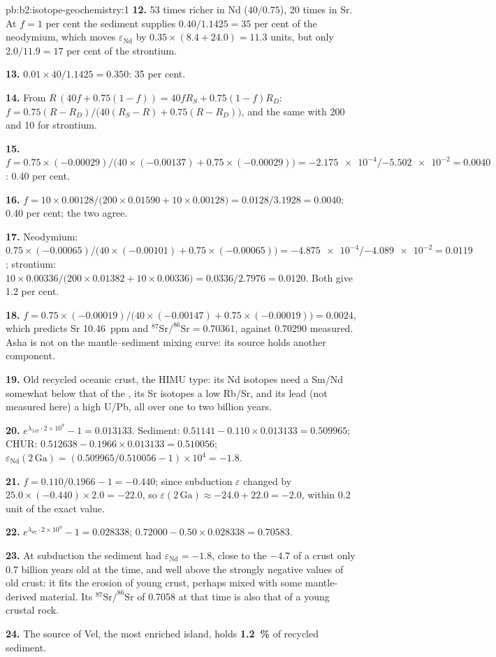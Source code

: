 \begin{solution}{pb:b2:isotope-geochemistry:1}
\textbf{12.} 53 times richer in Nd ($40/0.75$), 20 times in Sr. At $f = 1$ per cent the
sediment supplies $0.40/1.1425 = 35$ per cent of the neodymium, which moves
$\varepsilon_{\mathrm{Nd}}$ by $0.35\times(8.4 + 24.0) = 11.3$ units, but only $2.0/11.9 =
17$ per cent of the strontium.

\textbf{13.} $0.01\times40/1.1425 = 0.350$: 35 per cent.

\textbf{14.} From $R\,(40f + 0.75(1-f)) = 40fR_S + 0.75(1-f)R_D$:
$f = 0.75(R - R_D)/\bigl(40(R_S - R) + 0.75(R - R_D)\bigr)$, and the same with 200
and 10 for strontium.

\textbf{15.} $f = 0.75\times(-0.00029)/\bigl(40\times(-0.00137) + 0.75\times(-0.00029)\bigr)
= \num{-2.175e-4}/\num{-5.502e-2} = 0.0040$: 0.40 per cent.

\textbf{16.} $f = 10\times0.00128/\bigl(200\times0.01590 + 10\times0.00128\bigr) =
0.0128/3.1928 = 0.0040$: 0.40 per cent; the two agree.

\textbf{17.} Neodymium: $0.75\times(-0.00065)/\bigl(40\times(-0.00101) +
0.75\times(-0.00065)\bigr) = \num{-4.875e-4}/\num{-4.089e-2} = 0.0119$; strontium:
$10\times0.00336/\bigl(200\times0.01382 + 10\times0.00336\bigr) = 0.0336/2.7976 = 0.0120$.
Both give 1.2 per cent.

\textbf{18.} $f = 0.75\times(-0.00019)/\bigl(40\times(-0.00147) + 0.75\times(-0.00019)\bigr)
= 0.0024$, which predicts Sr \qty{10.46}{ppm} and $^{87}\mathrm{Sr}/^{86}\mathrm{Sr} =
0.70361$, against 0.70290 measured. Asha is not on the mantle--sediment mixing curve:
its source holds another component.

\textbf{19.} Old recycled oceanic crust, the HIMU type: its Nd isotopes need a Sm/Nd
somewhat below that of the , its Sr isotopes a low Rb/Sr, and its
lead (not measured here) a high U/Pb, all over one to two billion years.

\textbf{20.} $e^{\lambda_{147}\cdot2\times10^9} - 1 = 0.013133$. Sediment: $0.51141 -
0.110\times0.013133 = 0.509965$; CHUR: $0.512638 - 0.1966\times0.013133 = 0.510056$;
$\varepsilon_{\mathrm{Nd}}(2\,\mathrm{Ga}) = (0.509965/0.510056 - 1)\times10^4 = -1.8$.

\textbf{21.} $f = 0.110/0.1966 - 1 = -0.440$; since subduction $\varepsilon$ changed by
$25.0\times(-0.440)\times2.0 = -22.0$, so $\varepsilon(2\,\mathrm{Ga}) \approx -24.0 + 22.0
= -2.0$, within 0.2 unit of the exact value.

\textbf{22.} $e^{\lambda_{87}\cdot2\times10^9} - 1 = 0.028338$;
$0.72000 - 0.50\times0.028338 = 0.70583$.

\textbf{23.} At subduction the sediment had $\varepsilon_{\mathrm{Nd}} = -1.8$, close to the
$-4.7$ of a crust only 0.7 billion years old at the time, and well above the
strongly negative values of old crust: it fits the erosion of young crust, perhaps
mixed with some mantle-derived material. Its $^{87}\mathrm{Sr}/^{86}\mathrm{Sr}$ of
0.7058 at that time is also that of a young crustal rock.

\textbf{24.} The source of Vel, the most enriched island, holds
\textbf{\qty[text-series-to-math=true]{1.2}{\percent}} of recycled sediment.
\end{solution}
